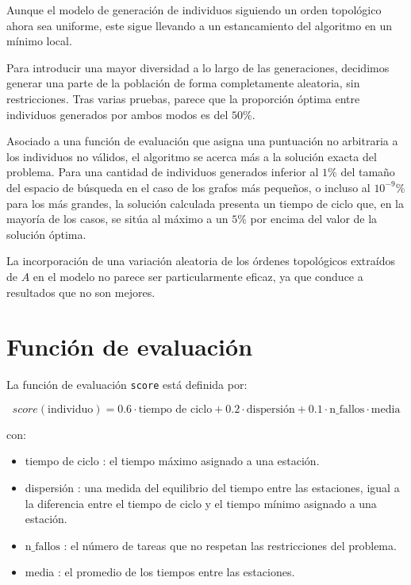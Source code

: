 \documentclass[12pt,a4paper]{report}
\begin{document}
    Aunque el modelo de generación de individuos siguiendo un orden topológico ahora sea uniforme, este sigue llevando a un estancamiento del algoritmo en un mínimo local.

    Para introducir una mayor diversidad a lo largo de las generaciones, decidimos generar una parte de la población de forma completamente aleatoria, sin restricciones. Tras varias pruebas, parece que la proporción óptima entre individuos generados por ambos modos es del $50\%$.

    Asociado a una función de evaluación que asigna una puntuación no arbitraria a los individuos no válidos, el algoritmo se acerca más a la solución exacta del problema. Para una cantidad de individuos generados inferior al $1\%$ del tamaño del espacio de búsqueda en el caso de los grafos más pequeños, o incluso al $10^{-9}\%$ para los más grandes, la solución calculada presenta un tiempo de ciclo que, en la mayoría de los casos, se sitúa al máximo a un $5\%$ por encima del valor de la solución óptima.

    La incorporación de una variación aleatoria de los órdenes topológicos extraídos de $A$ en el modelo no parece ser particularmente eficaz, ya que conduce a resultados que no son mejores.

    \section{Función de evaluación}

    La función de evaluación \texttt{score} está definida por:

    \[
    score(\text{individuo}) = 0.6 \cdot \text{tiempo de ciclo} + 0.2 \cdot \text{dispersión} + 0.1 \cdot \text{n\_fallos} \cdot \text{media}
    \]
    \vspace{0.5cm}

    con:

    \begin{itemize}
    \item tiempo de ciclo : el tiempo máximo asignado a una estación.
    \item dispersión : una medida del equilibrio del tiempo entre las estaciones,
    igual a la diferencia entre el tiempo de ciclo y el tiempo mínimo asignado a una estación.
    \item $\text{n\_fallos}$ : el número de tareas que no respetan las restricciones del problema.
    \item media : el promedio de los tiempos entre las estaciones.
    \end{itemize}
\end{document}
